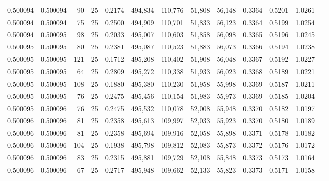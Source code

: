 \begin{tabular}{rrrrrrrrrrrrr}
0.500094 & 0.500094 &    90 &  25 &                                     0.2174 & 494,834 & 110,776 &  51,808 &  56,148 & 0.3364 & 0.5201 & 1.0261 \\
0.500094 & 0.500094 &    75 &  25 &                                     0.2500 & 494,909 & 110,701 &  51,833 &  56,123 & 0.3364 & 0.5199 & 1.0254 \\
0.500094 & 0.500095 &    98 &  25 &                                     0.2033 & 495,007 & 110,603 &  51,858 &  56,098 & 0.3365 & 0.5196 & 1.0245 \\
0.500095 & 0.500095 &    80 &  25 &                                     0.2381 & 495,087 & 110,523 &  51,883 &  56,073 & 0.3366 & 0.5194 & 1.0238 \\
0.500095 & 0.500095 &   121 &  25 &                                     0.1712 & 495,208 & 110,402 &  51,908 &  56,048 & 0.3367 & 0.5192 & 1.0227 \\
0.500095 & 0.500095 &    64 &  25 &                                     0.2809 & 495,272 & 110,338 &  51,933 &  56,023 & 0.3368 & 0.5189 & 1.0221 \\
0.500095 & 0.500095 &   108 &  25 &                                     0.1880 & 495,380 & 110,230 &  51,958 &  55,998 & 0.3369 & 0.5187 & 1.0211 \\
0.500095 & 0.500095 &    76 &  25 &                                     0.2475 & 495,456 & 110,154 &  51,983 &  55,973 & 0.3369 & 0.5185 & 1.0204 \\
0.500095 & 0.500096 &    76 &  25 &                                     0.2475 & 495,532 & 110,078 &  52,008 &  55,948 & 0.3370 & 0.5182 & 1.0197 \\
0.500096 & 0.500096 &    81 &  25 &                                     0.2358 & 495,613 & 109,997 &  52,033 &  55,923 & 0.3370 & 0.5180 & 1.0189 \\
0.500096 & 0.500096 &    81 &  25 &                                     0.2358 & 495,694 & 109,916 &  52,058 &  55,898 & 0.3371 & 0.5178 & 1.0182 \\
0.500096 & 0.500096 &   104 &  25 &                                     0.1938 & 495,798 & 109,812 &  52,083 &  55,873 & 0.3372 & 0.5176 & 1.0172 \\
0.500096 & 0.500096 &    83 &  25 &                                     0.2315 & 495,881 & 109,729 &  52,108 &  55,848 & 0.3373 & 0.5173 & 1.0164 \\
0.500096 & 0.500096 &    67 &  25 &                                     0.2717 & 495,948 & 109,662 &  52,133 &  55,823 & 0.3373 & 0.5171 & 1.0158 \\

\end{tabular}
